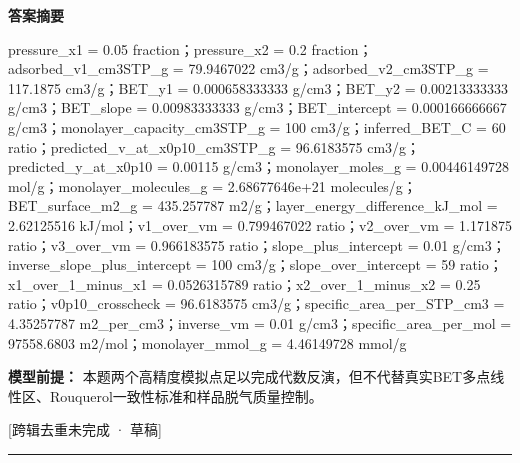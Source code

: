 \documentclass[UTF8,11pt,a4paper]{ctexart}
\begin{document}
\noindent\textbf{答案摘要}\par
pressure\_x1 = 0.05 fraction；pressure\_x2 = 0.2 fraction；adsorbed\_v1\_cm3STP\_g = 79.9467022 cm3/g；adsorbed\_v2\_cm3STP\_g = 117.1875 cm3/g；BET\_y1 = 0.000658333333 g/cm3；BET\_y2 = 0.00213333333 g/cm3；BET\_slope = 0.00983333333 g/cm3；BET\_intercept = 0.000166666667 g/cm3；monolayer\_capacity\_cm3STP\_g = 100 cm3/g；inferred\_BET\_C = 60 ratio；predicted\_v\_at\_x0p10\_cm3STP\_g = 96.6183575 cm3/g；predicted\_y\_at\_x0p10 = 0.00115 g/cm3；monolayer\_moles\_g = 0.00446149728 mol/g；monolayer\_molecules\_g = 2.68677646e+21 molecules/g；BET\_surface\_m2\_g = 435.257787 m2/g；layer\_energy\_difference\_kJ\_mol = 2.62125516 kJ/mol；v1\_over\_vm = 0.799467022 ratio；v2\_over\_vm = 1.171875 ratio；v3\_over\_vm = 0.966183575 ratio；slope\_plus\_intercept = 0.01 g/cm3；inverse\_slope\_plus\_intercept = 100 cm3/g；slope\_over\_intercept = 59 ratio；x1\_over\_1\_minus\_x1 = 0.0526315789 ratio；x2\_over\_1\_minus\_x2 = 0.25 ratio；v0p10\_crosscheck = 96.6183575 cm3/g；specific\_area\_per\_STP\_cm3 = 4.35257787 m2\_per\_cm3；inverse\_vm = 0.01 g/cm3；specific\_area\_per\_mol = 97558.6803 m2/mol；monolayer\_mmol\_g = 4.46149728 mmol/g\par
\noindent\textbf{模型前提：}
本题两个高精度模拟点足以完成代数反演，但不代替真实BET多点线性区、Rouquerol一致性标准和样品脱气质量控制。\par
\noindent\textcolor{red!65!black}{[跨辑去重未完成 · 草稿]} \par
\medskip\hrule\medskip
{}
\end{document}
